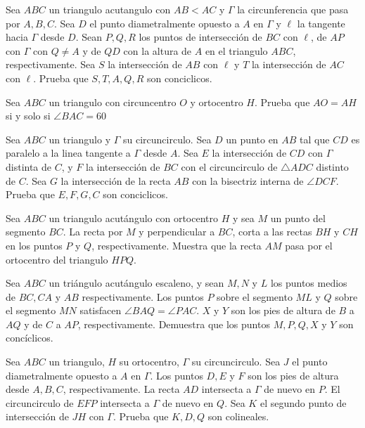 \documentclass[11pt]{scrartcl}
\newcommand{\gad}{\textcolor{yellow}{$\bigstar$}}
\newcommand{\thmdifficulty}{0}
\newcommand{\problemdiff}[1]{\renewcommand{\thmdifficulty}{#1}}
\begin{document}
\problemdiff{3.5}
\begin{problem}
    Sea $ABC$ un triangulo acutangulo con $AB<AC$ y $\Gamma$ la circunferencia que pasa por $A,B,C$. Sea $D$ el punto diametralmente opuesto a $A$ en $\Gamma$ y $\ell$ la tangente hacia $\Gamma$ desde $D$. 
    Sean $P,Q,R$ los puntos de intersección de $BC$ con $\ell$, de $AP$ con $\Gamma$ con $Q\neq A$ y de $QD$ con la altura de $A$ en el triangulo $ABC$, respectivamente. Sea $S$ la intersección de $AB$ con $\ell$ y $T$ la intersección de $AC$ con $\ell$. Prueba que $S,T,A,Q,R$ son conciclicos. 
\end{problem}
\problemdiff{3.5}
\begin{problem}
            Sea $ABC$ un triangulo con circuncentro $O$ y ortocentro $H$. Prueba que $AO=AH$ si y solo si $\angle BAC=60$
\end{problem}
\problemdiff{4}
\begin{problem} [\gad]
   Sea $ABC$ un triangulo y $\Gamma$ su circuncirculo. Sea $D$ un punto en $AB$ tal que $CD$ es paralelo a la linea tangente a $\Gamma$ desde $A$. Sea $E$ la intersección de $CD$ con $\Gamma$ distinta de $C$, y $F$ la intersección de $BC$ con el circuncirculo de $\triangle ADC$ distinto de $C$. 
   Sea $G$ la intersección de la recta $AB$ con la bisectriz interna de $\angle DCF$. Prueba que $E,F,G,C$ son conciclicos. 
\end{problem}
\problemdiff{4}
\begin{problem}
    Sea $ABC$ un triangulo acutángulo con ortocentro $H$ y sea $M$ un punto del segmento $BC$. La recta por $M$ y perpendicular a $BC$, corta a las rectas $BH$ y $CH$ en los puntos $P$ y $Q$, respectivamente. Muestra que la recta $AM$ pasa por el ortocentro del triangulo $HPQ$.
\end{problem}
\problemdiff{4}
\begin{problem}
Sea $ABC$ un triángulo acutángulo escaleno, y sean $M, N$ y $L$ los puntos medios de $BC, CA$ y $AB$ respectivamente. Los puntos $P$ sobre el segmento $ML$ y $Q$ sobre el segmento $MN$ satisfacen $\angle BAQ = \angle PAC$. $X$ y $Y$ son los pies de altura de $B$ a $AQ$ y de $C$ a $AP$, respectivamente. Demuestra que los puntos $M, P, Q, X$ y $Y$ son concíclicos.
\end{problem}
\problemdiff{4}
\begin{problem}
    Sea $ABC$ un triangulo, $H$ su ortocentro, $\Gamma$ su circuncirculo. Sea $J$ el punto diametralmente opuesto a $A$ en $\Gamma$. Los puntos $D,E$ y $F$ son los pies de altura desde $A,B,C$, respectivamente. La recta $AD$ intersecta a $\Gamma$ de nuevo en $P$. El circuncirculo de $EFP$ intersecta a $\Gamma$ de nuevo en $Q$. 
    Sea $K$ el segundo punto de intersección de $JH$ con $\Gamma$. Prueba que $K,D,Q$ son colineales.
\end{problem}
\end{document}

